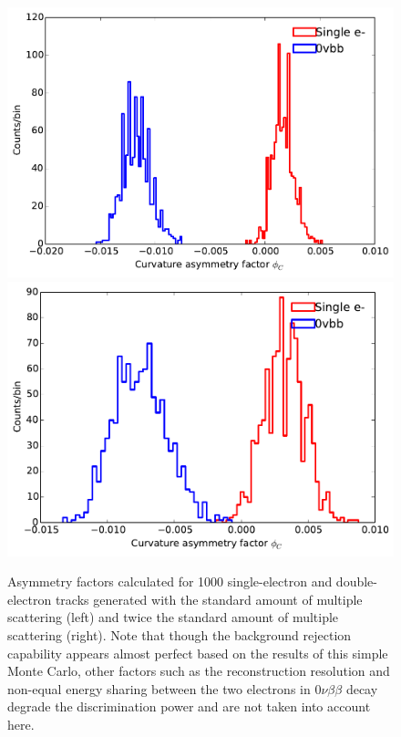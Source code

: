 \documentclass{JINST}
\begin{document}
\begin{figure}[!htb]
	\includegraphics[scale=0.45]{fig/scurv_diff_means_ms13pt6.pdf}
	\includegraphics[scale=0.45]{fig/scurv_diff_means_ms27pt2.pdf}
	\caption{\label{fig_assym_cf}Asymmetry factors calculated for 1000 single-electron and double-electron tracks generated with the standard amount of multiple scattering (left) and twice the standard amount of multiple scattering (right).  Note that though the background rejection capability appears almost perfect based on the results of this simple Monte Carlo, other factors such as the reconstruction resolution and non-equal energy sharing between the two electrons in $0\nu\beta\beta$ decay degrade the discrimination power and are not taken into account here.}
\end{figure}
\end{document}
